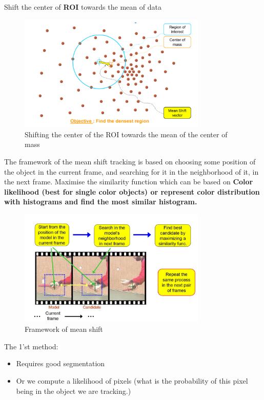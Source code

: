 \documentclass[a4paper]{article}
\begin{document}
Shift the center of \textbf{ROI} towards the mean of data 
\begin{figure}[H]
\centering
\includegraphics[width=0.8\textwidth]{figures/mean_shift.png}
\caption{Shifting the center of the ROI towards the mean of the center of mass}
\label{fig:mean_shift}
\end{figure} 

The framework of the mean shift tracking is based on choosing some position of the object in the current frame, and searching for it in the neighborhood of it, in the next frame. Maximise the similarity function which can be based on \textbf{Color likelihood (best for single color objects) or represent color distribution with histograms and find the most similar histogram.} 
\begin{figure}[H]
\centering
\includegraphics[width=0.8\textwidth]{figures/mean_shift_framework.png}
\caption{Framework of mean shift}
\label{fig:mean_shift_framework}
\end{figure} 

The 1'st method:
\begin{itemize}
	\item Requires good segmentation
	\item Or we compute a likelihood of pixels (what is the probability of this pixel being in the object we are tracking.)
\end{itemize}
\end{document}
